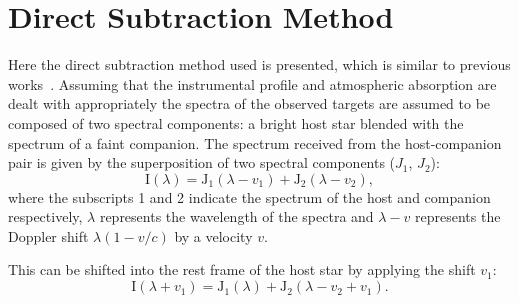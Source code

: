 \section{Direct Subtraction Method}
\label{sec:direct-subtraction}
Here the direct subtraction method used is presented, which is similar to previous works~\citep{ferluga_separating_1997, kostogryz_spectral_2013}.
Assuming that the instrumental profile and atmospheric absorption are dealt with appropriately the spectra of the observed targets are assumed to be composed of two spectral components:
a bright host star blended with the spectrum of a faint companion.
The spectrum received from the host-companion pair is given by the superposition of two spectral components (\(J_{1}\), \(J_{2}\)):
\begin{equation}
\textrm{I}(\lambda) = \textrm{J}_{1}(\lambda - v_{1}) + \textrm{J}_{2}(\lambda - v_{2}),
\end{equation}
where the subscripts 1 and 2 indicate the spectrum of the host and companion respectively, \(\lambda\) represents the wavelength of the spectra and \(\lambda-v\) represents the Doppler shift \(\lambda(1-v/c)\) by a velocity \(v\).

This can be shifted into the rest frame of the host star by applying the shift \(v_1\):
\begin{equation}
\textrm{I}(\lambda + v_{1}) = \textrm{J}_{1}(\lambda) + \textrm{J}_{2}(\lambda - v_{2} + v_{1}).
\end{equation}

